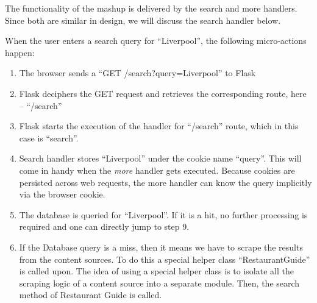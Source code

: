 The functionality of the mashup is delivered by the search and more handlers. Since both are similar in design, we will discuss the search handler below.

When the user enters a search query for “Liverpool”, the following micro-actions happen:
\begin{enumerate}
\item The browser sends a “GET  /search?query=Liverpool” to Flask
\item Flask deciphers the GET request and retrieves the corresponding route, here – “/search”
\item Flask starts the execution of the handler for “/search” route, which in this case is “search”.
\item Search handler stores “Liverpool” under the cookie name “query”. This will come in handy when the \textsl{more} handler gets executed. Because cookies are persisted across web requests, the more handler can know the query implicitly via the browser cookie.
\item The database is queried for “Liverpool”. If it is a hit, no further processing is required and one can directly jump to step 9.
\item If the Database query is a miss, then it means we have to scrape the results from the content sources. To do this a special helper class “RestaurantGuide” is called upon. The idea of using a special helper class is to isolate all the scraping logic of a content source into a separate module. Then, the search method of Restaurant Guide is called.
  
  
  

\end{enumerate}
